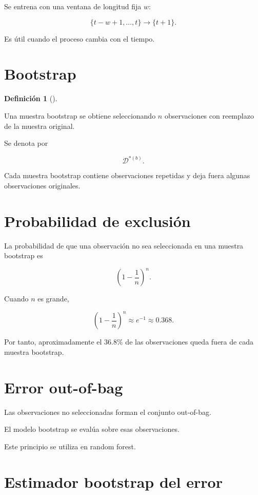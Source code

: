 \documentclass[
  spanish,
  11pt,
  letterpaper,
  DIV=11,
  numbers=noendperiod]{scrreprt}
\theoremstyle{definition}
\newtheorem{definition}{Definición}[chapter]
\theoremstyle{plain}
\theoremstyle{definition}
\theoremstyle{remark}
\begin{document}
Se entrena con una ventana de longitud fija \(w\):

\[
\{t-w+1,\ldots,t\}
\to
\{t+1\}.
\]

Es útil cuando el proceso cambia con el tiempo.

\section{Bootstrap}\label{bootstrap}

\begin{definition}[]\protect\hypertarget{def-bootstrap}{}\label{def-bootstrap}

Una muestra bootstrap se obtiene seleccionando \(n\) observaciones con
reemplazo de la muestra original.

\end{definition}

Se denota por

\[
\mathcal{D}^{*(b)}.
\]

Cada muestra bootstrap contiene observaciones repetidas y deja fuera
algunas observaciones originales.

\section{Probabilidad de exclusión}\label{probabilidad-de-exclusiuxf3n}

La probabilidad de que una observación no sea seleccionada en una
muestra bootstrap es

\[
\left(
1-\frac{1}{n}
\right)^n.
\]

Cuando \(n\) es grande,

\[
\left(
1-\frac{1}{n}
\right)^n
\approx
e^{-1}
\approx
0.368.
\]

Por tanto, aproximadamente el \(36.8\%\) de las observaciones queda
fuera de cada muestra bootstrap.

\section{Error out-of-bag}\label{error-out-of-bag}

Las observaciones no seleccionadas forman el conjunto out-of-bag.

El modelo bootstrap se evalúa sobre esas observaciones.

Este principio se utiliza en random forest.

\section{Estimador bootstrap del
error}\label{estimador-bootstrap-del-error}
\end{document}

